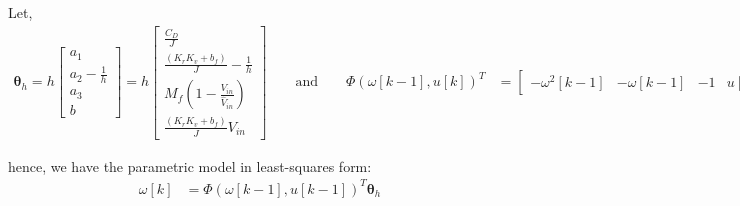 Let,
\begin{align*}
    \pmb \theta_h = h
    \begin{bmatrix}
        a_1 \\
        a_2 - \frac{1}{h} \\
        a_3 \\
        b
    \end{bmatrix} =
    h
    \begin{bmatrix}
        \frac{C_{D}}{J} \\
        \frac{(K_rK_v + b_f)}{J} - \frac{1}{h}  \\
        M_f \left( 1 - \frac{V_{in}}{\hat V_{in}}\right)\\
        \frac{(K_rK_v + b_f)}{J} V_{in}
    \end{bmatrix}
    \qquad \text{and} \qquad
    \Phi(\omega[k-1], u[k])^T &=  \begin{bmatrix} - \omega^2[k-1] & -\omega[k-1] & -1 & u[k-1] \end{bmatrix}
\end{align*}

hence, we have the parametric model in least-squares form:
\begin{align*}
    \omega[k] &= \Phi(\omega[k-1], u[k-1])^T \pmb \theta_h
\end{align*}

%
